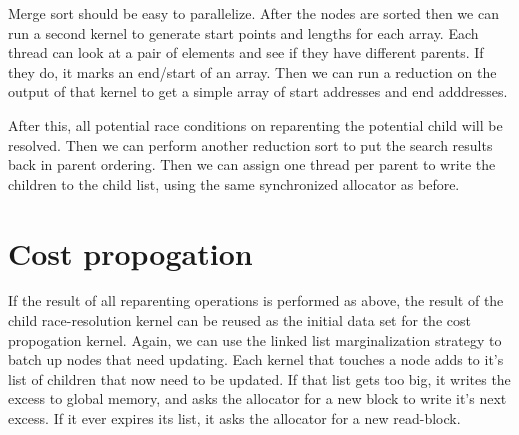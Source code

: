 Merge sort should be easy to parallelize. After the nodes are sorted then we can run a second kernel to generate start points and lengths for each array. Each thread can look at a pair of elements and see if they have different parents. If they do, it marks an end/start of an array. Then we can run a reduction on the output of that kernel to get a simple array of start addresses and end adddresses. 

After this, all potential race conditions on reparenting the potential child will be resolved. Then we can perform another reduction sort to put the search results back in parent ordering. Then we can assign one thread per parent to write the children to the child list, using the same synchronized allocator as before. 
 
\begin{figure}[H]
\begin{centering}
    \texttt{[image: \\figfile\{fig/kernel\_parent\_rotate]}}
    \caption{Parent Reduction}
\end{centering} 
\end{figure} 


\section{Cost propogation}
If the result of all reparenting operations is performed as above, the result of the child race-resolution kernel can be reused as the initial data set for the cost propogation kernel. Again, we can use the linked list marginalization strategy to batch up nodes that need updating. Each kernel that touches a node adds to it's list of children that now need to be updated. If that list gets too big, it writes the excess to global memory, and asks the allocator for a new block to write it's next excess. If it ever expires its list, it asks the allocator for a new read-block.







 